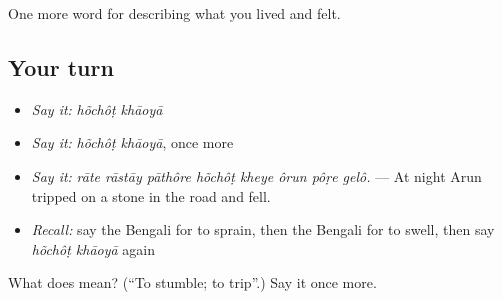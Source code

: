 \begin{grammarlens}[title={What you've built}]
One more word for describing what you lived and felt.
\end{grammarlens}

\subsection*{Your turn}
\begin{itemize}
\raggedright
  \item \emph{Say it:} \emph{hõchôṭ khāoyā}
  \item \emph{Say it:} \emph{hõchôṭ khāoyā}, once more
  \item \emph{Say it:} \emph{rāte rāstāy pāthôre hõchôṭ kheye ôrun pôṛe gelô.} — At night Arun tripped on a stone in the road and fell.
  \item \emph{Recall:} say the Bengali for to sprain, then the Bengali for to swell, then say \emph{hõchôṭ khāoyā} again
\end{itemize}

\begin{tcolorbox}[breakable,colback=teal!4,colframe=teal!35!black,title={Before you move on}]
What does   mean? (\textquotedblleft{}To stumble; to trip\textquotedblright{}.) Say it once more.
\end{tcolorbox}
